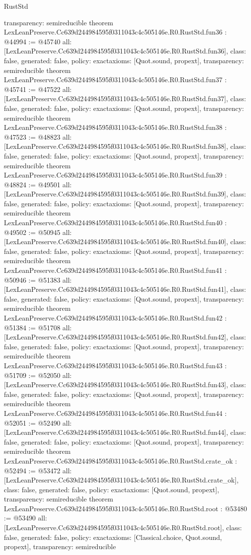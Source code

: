 \begin{lexlean}{RustStd}
\begin{coremodule}
{  transparency: semireducible
}
theorem LexLeanPreserve.Cc639d244984595f0311043c4c505146e.R0.RustStd.fun36 : @44994 := @45740 {
  all: [LexLeanPreserve.Cc639d244984595f0311043c4c505146e.R0.RustStd.fun36],
  class: false,
  generated: false,
  policy: exact{axioms: [Quot.sound, propext]},
  transparency: semireducible
}
theorem LexLeanPreserve.Cc639d244984595f0311043c4c505146e.R0.RustStd.fun37 : @45741 := @47522 {
  all: [LexLeanPreserve.Cc639d244984595f0311043c4c505146e.R0.RustStd.fun37],
  class: false,
  generated: false,
  policy: exact{axioms: [Quot.sound, propext]},
  transparency: semireducible
}
theorem LexLeanPreserve.Cc639d244984595f0311043c4c505146e.R0.RustStd.fun38 : @47523 := @48823 {
  all: [LexLeanPreserve.Cc639d244984595f0311043c4c505146e.R0.RustStd.fun38],
  class: false,
  generated: false,
  policy: exact{axioms: [Quot.sound, propext]},
  transparency: semireducible
}
theorem LexLeanPreserve.Cc639d244984595f0311043c4c505146e.R0.RustStd.fun39 : @48824 := @49501 {
  all: [LexLeanPreserve.Cc639d244984595f0311043c4c505146e.R0.RustStd.fun39],
  class: false,
  generated: false,
  policy: exact{axioms: [Quot.sound, propext]},
  transparency: semireducible
}
theorem LexLeanPreserve.Cc639d244984595f0311043c4c505146e.R0.RustStd.fun40 : @49502 := @50945 {
  all: [LexLeanPreserve.Cc639d244984595f0311043c4c505146e.R0.RustStd.fun40],
  class: false,
  generated: false,
  policy: exact{axioms: [Quot.sound, propext]},
  transparency: semireducible
}
theorem LexLeanPreserve.Cc639d244984595f0311043c4c505146e.R0.RustStd.fun41 : @50946 := @51383 {
  all: [LexLeanPreserve.Cc639d244984595f0311043c4c505146e.R0.RustStd.fun41],
  class: false,
  generated: false,
  policy: exact{axioms: [Quot.sound, propext]},
  transparency: semireducible
}
theorem LexLeanPreserve.Cc639d244984595f0311043c4c505146e.R0.RustStd.fun42 : @51384 := @51708 {
  all: [LexLeanPreserve.Cc639d244984595f0311043c4c505146e.R0.RustStd.fun42],
  class: false,
  generated: false,
  policy: exact{axioms: [Quot.sound, propext]},
  transparency: semireducible
}
theorem LexLeanPreserve.Cc639d244984595f0311043c4c505146e.R0.RustStd.fun43 : @51709 := @52050 {
  all: [LexLeanPreserve.Cc639d244984595f0311043c4c505146e.R0.RustStd.fun43],
  class: false,
  generated: false,
  policy: exact{axioms: [Quot.sound, propext]},
  transparency: semireducible
}
theorem LexLeanPreserve.Cc639d244984595f0311043c4c505146e.R0.RustStd.fun44 : @52051 := @52490 {
  all: [LexLeanPreserve.Cc639d244984595f0311043c4c505146e.R0.RustStd.fun44],
  class: false,
  generated: false,
  policy: exact{axioms: [Quot.sound, propext]},
  transparency: semireducible
}
theorem LexLeanPreserve.Cc639d244984595f0311043c4c505146e.R0.RustStd.crate_ok : @52494 := @53472 {
  all: [LexLeanPreserve.Cc639d244984595f0311043c4c505146e.R0.RustStd.crate_ok],
  class: false,
  generated: false,
  policy: exact{axioms: [Quot.sound, propext]},
  transparency: semireducible
}
theorem LexLeanPreserve.Cc639d244984595f0311043c4c505146e.R0.RustStd.root : @53480 := @53490 {
  all: [LexLeanPreserve.Cc639d244984595f0311043c4c505146e.R0.RustStd.root],
  class: false,
  generated: false,
  policy: exact{axioms: [Classical.choice, Quot.sound, propext]},
  transparency: semireducible
}


\end{coremodule}
\end{lexlean}
